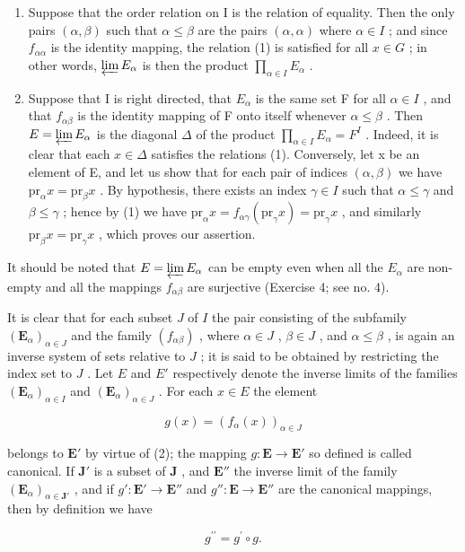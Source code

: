 \begin{enumerate}
\def\labelenumi{(\arabic{enumi})}
\item
  Suppose that the order relation on I is the relation of equality. Then the only pairs \((\alpha, \beta)\) such that \(\alpha \leqslant \beta\) are the pairs \((\alpha, \alpha)\) where \(\alpha \in I\) ; and since \(f_{\alpha \alpha}\) is the identity mapping, the relation (1) is satisfied for all \(x \in G\) ; in other words, \(\varprojlim E_{\alpha}\) is then the product \(\prod_{\alpha \in I} E_{\alpha}\) .
\item
  Suppose that I is right directed, that \(E_{\alpha}\) is the same set F for all \(\alpha \in I\) , and that \(f_{\alpha\beta}\) is the identity mapping of F onto itself whenever \(\alpha \leqslant \beta\) . Then \(E = \varprojlim E_{\alpha}\) is the diagonal \(\Delta\) of the product \(\prod_{\alpha \in I} E_{\alpha} = F^{I}\) . Indeed, it is clear that each \(x \in \Delta\) satisfies the relations (1). Conversely, let x be an element of E, and let us show that for each pair of indices \((\alpha, \beta)\) we have \(\mathrm{pr}_{\alpha}x = \mathrm{pr}_{\beta}x\) . By hypothesis, there exists an index \(\gamma \in I\) such that \(\alpha \leqslant \gamma\) and \(\beta \leqslant \gamma\) ; hence by (1) we have \(\mathrm{pr}_{\alpha}x = f_{\alpha \gamma}(\mathrm{pr}_{\gamma}x) = \mathrm{pr}_{\gamma}x\) , and similarly \(\mathrm{pr}_{\beta}x = \mathrm{pr}_{\gamma}x\) , which proves our assertion.
\end{enumerate}

It should be noted that \(E = \varprojlim E_{\alpha}\) can be empty even when all the \(E_{\alpha}\) are non-empty and all the mappings \(f_{\alpha\beta}\) are surjective (Exercise 4; see no. 4).

It is clear that for each subset \(J\) of \(I\) the pair consisting of the subfamily \((\mathbf{E}_{\alpha})_{\alpha \in J}\) and the family \((f_{\alpha \beta})\) , where \(\alpha \in J\) , \(\beta \in J\) , and \(\alpha \leqslant \beta\) , is again an inverse system of sets relative to \(J\) ; it is said to be obtained by restricting the index set to \(J\) . Let \(E\) and \(E'\) respectively denote the inverse limits of the families \((\mathbf{E}_{\alpha})_{\alpha \in I}\) and \((\mathbf{E}_{\alpha})_{\alpha \in J}\) . For each \(x \in E\) the element

\[
g (x) = \left(f _ {\alpha} (x)\right) _ {\alpha \in J}\tag{3}
\]

belongs to \(\mathbf{E}'\) by virtue of (2); the mapping \(g: \mathbf{E} \to \mathbf{E}'\) so defined is called canonical. If \(\mathbf{J}'\) is a subset of \(\mathbf{J}\) , and \(\mathbf{E}''\) the inverse limit of the family \((\mathbf{E}_{\alpha})_{\alpha \in \mathbf{J}'}\) , and if \(g': \mathbf{E}' \to \mathbf{E}''\) and \(g'': \mathbf{E} \to \mathbf{E}''\) are the canonical mappings, then by definition we have

\[
g ^ {\prime \prime} = g ^ {\prime} \circ g.\tag{4}
\]

